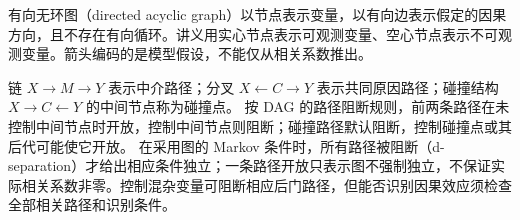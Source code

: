 \begin{definition}[DAG]\label{reg:entry:9}
有向无环图（directed acyclic graph）以节点表示变量，以有向边表示假定的因果方向，且不存在有向循环。讲义用实心节点表示可观测变量、空心节点表示不可观测变量。箭头编码的是模型假设，不能仅从相关系数推出。
\end{definition}

\begin{proposition}[三种基本路径的功能]\label{reg:entry:10}
链 $X\to M\to Y$ 表示中介路径；分叉 $X\leftarrow C\to Y$ 表示共同原因路径；碰撞结构 $X\to C\leftarrow Y$ 的中间节点称为碰撞点。
按 DAG 的路径阻断规则，前两条路径在未控制中间节点时开放，控制中间节点则阻断；碰撞路径默认阻断，控制碰撞点或其后代可能使它开放。
在采用图的 Markov 条件时，所有路径被阻断（d-separation）才给出相应条件独立；一条路径开放只表示图不强制独立，不保证实际相关系数非零。控制混杂变量可阻断相应后门路径，但能否识别因果效应须检查全部相关路径和识别条件。
\end{proposition}

